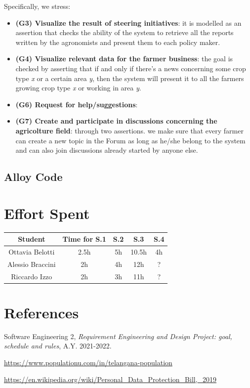 \documentclass[table, 12pt]{article}
\begin{document}
Specifically, we stress:
\begin{itemize}
    \item \textbf{(G3) Visualize the result of steering initiatives}: it is modelled as an assertion that checks the ability of the system to retrieve all the reports written by the agronomists and present them to each policy maker. %
    \item \textbf{(G4) Visualize relevant data for the farmer business}: the goal is checked by asserting that if and only if there's a news concerning some crop type \textit{x} or a certain area \textit{y}, then the system will present it to all the farmers growing crop type \textit{x} or working in area \textit{y}.
    \item \textbf{(G6) Request for help/suggestions}: 
    \item \textbf{(G7) Create and participate in discussions concerning the agricolture field}: through two assertions. we make sure that every farmer can create a new topic in the Forum as long as he/she belong to the system and can also join discussions already started by anyone else.
\end{itemize}

\subsection{Alloy Code}

\section{Effort Spent}
    \begin{tabular}{| c || c | c| c| c |}
        \hline
        Student & Time for S.1 & S.2 & S.3 & S.4 \\ \hline
        Ottavia Belotti & 2.5h & 5h & 10.5h & 4h \\
        Alessio Braccini & 2h & 4h & 12h & ? \\
        Riccardo Izzo & 2h & 3h & 11h & ? \\
        \hline
    \end{tabular}

\section{References}

\begin{thebibliography}{9}
    Software Engineering 2,
    \emph{Requirement Engineering and Design Project: goal, schedule and rules}, A.Y. 2021-2022.

    \url{https://www.populationu.com/in/telangana-population}

    \url{https://en.wikipedia.org/wiki/Personal_Data_Protection_Bill,_2019}

\end{thebibliography}
\end{document}
